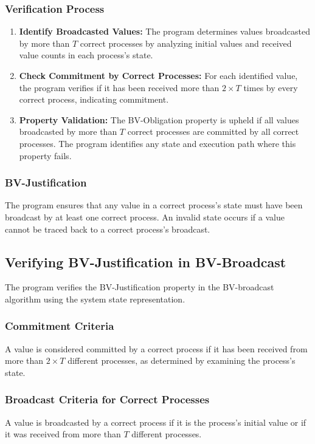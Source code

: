 \documentclass[a4paper,11pt,oneside]{report}
\begin{document}
\subsubsection{Verification Process}
\begin{enumerate}
    \item \textbf{Identify Broadcasted Values:} The program determines values broadcasted by more than \( T \) correct processes by analyzing initial values and received value counts in each process's state.
    \item \textbf{Check Commitment by Correct Processes:} For each identified value, the program verifies if it has been received more than \( 2 \times T \) times by every correct process, indicating commitment.
    \item \textbf{Property Validation:} The BV-Obligation property is upheld if all values broadcasted by more than \( T \) correct processes are committed by all correct processes. The program identifies any state and execution path where this property fails.
\end{enumerate}

\subsubsection{BV-Justification}
The program ensures that any value in a correct process's state must have been broadcast by at least one correct process. An invalid state occurs if a value cannot be traced back to a correct process's broadcast.

\subsection{Verifying BV-Justification in BV-Broadcast}
The program verifies the BV-Justification property in the BV-broadcast algorithm using the system state representation.

\subsubsection{Commitment Criteria}
A value is considered committed by a correct process if it has been received from more than \( 2 \times T \) different processes, as determined by examining the process's state.

\subsubsection{Broadcast Criteria for Correct Processes}
A value is broadcasted by a correct process if it is the process's initial value or if it was received from more than \( T \) different processes.
\end{document}
